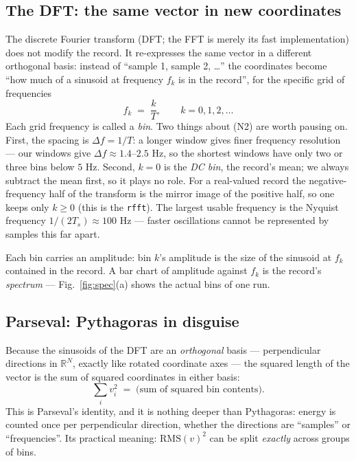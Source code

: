 \documentclass[10pt]{article}
\newcommand{\rms}{\mathrm{RMS}}
\begin{document}
\subsection{The DFT: the same vector in new coordinates}

The discrete Fourier transform (DFT; the FFT is merely its fast
implementation) does not modify the record. It re-expresses the same
vector in a different orthogonal basis: instead of ``sample 1,
sample 2, \dots'' the coordinates become ``how much of a sinusoid at
frequency $f_k$ is in the record'', for the specific grid of
frequencies
\begin{equation}
  f_k \;=\; \frac{k}{T}, \qquad k = 0, 1, 2, \dots
  \tag{N2}
\end{equation}
Each grid frequency is called a \emph{bin}. Two things about (N2) are
worth pausing on. First, the spacing is $\Delta f = 1/T$: a longer
window gives finer frequency resolution --- our windows give
$\Delta f \approx 1.4$--$2.5$ Hz, so the shortest windows have only
two or three bins below $5$ Hz. Second, $k=0$ is the \emph{DC bin},
the record's mean; we always subtract the mean first, so it plays no
role. For a real-valued record the negative-frequency half of the
transform is the mirror image of the positive half, so one keeps only
$k \ge 0$ (this is the \texttt{rfft}). The largest usable frequency
is the Nyquist frequency $1/(2T_s) \approx 100$ Hz --- faster
oscillations cannot be represented by samples this far apart.

Each bin carries an amplitude: bin $k$'s amplitude is the size of the
sinusoid at $f_k$ contained in the record. A bar chart of amplitude
against $f_k$ is the record's \emph{spectrum} ---
Fig.~\ref{fig:spec}(a) shows the actual bins of one run.

\subsection{Parseval: Pythagoras in disguise}

Because the sinusoids of the DFT are an \emph{orthogonal} basis ---
perpendicular directions in $\mathbb{R}^N$, exactly like rotated
coordinate axes --- the squared length of the vector is the sum of
squared coordinates in either basis:
\begin{equation}
  \textstyle\sum_i v_i^2 \;=\; \text{(sum of squared bin contents)}.
  \tag{N3}
\end{equation}
This is Parseval's identity, and it is nothing deeper than
Pythagoras: energy is counted once per perpendicular direction,
whether the directions are ``samples'' or ``frequencies''. Its
practical meaning: $\rms(v)^2$ can be split \emph{exactly} across
groups of bins.
\end{document}
